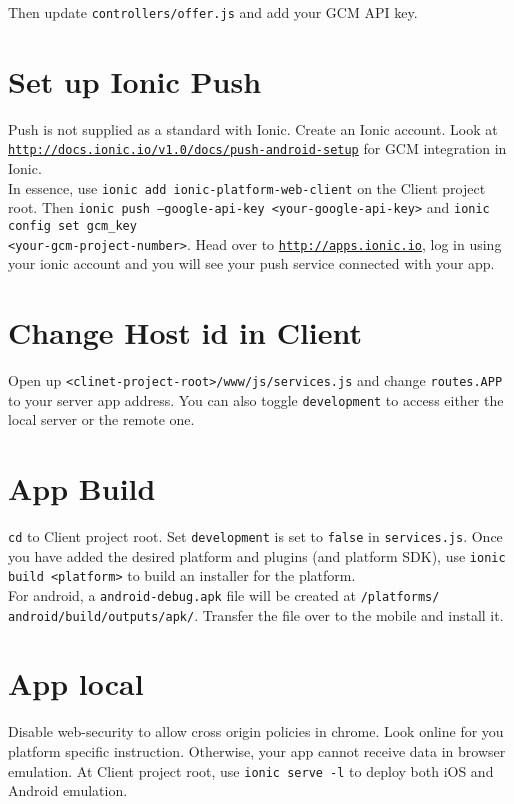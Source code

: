 Then update \texttt{controllers/offer.js} and add your GCM API key.

\section{Set up Ionic Push}

Push is not supplied as a standard with Ionic. Create an Ionic account. Look at \texttt{\hyperref[http://docs.ionic.io/v1.0/docs/push-android-setup]{http://docs.ionic.io/v1.0/docs/push-android-setup}} for GCM integration in Ionic.\\

In essence, use \texttt{ionic add ionic-platform-web-client} on the Client project root. Then \texttt{ionic push --google-api-key <your-google-api-key>} and \texttt{ionic config set gcm\_key}\\ \texttt{<your-gcm-project-number>}. Head over to \texttt{\hyperref[http://apps.ionic.io]{http://apps.ionic.io}}, log in using your ionic account and you will see your push service connected with your app.

\section{Change Host id in Client}

Open up \texttt{<clinet-project-root>/www/js/services.js} and change \texttt{routes.APP} to your server app address. You can also toggle \texttt{development} to access either the local server or the remote one.

\section{App Build}

\texttt{cd} to Client project root. Set \texttt{development} is set to \texttt{false} in \texttt{services.js}. Once you have added the desired platform and plugins (and platform SDK), use \texttt{ionic build <platform>} to build an installer for the platform.\\

For android, a \texttt{android-debug.apk} file will be created at \texttt{/platforms/\\android/build/outputs/apk/}. Transfer the file over to the mobile and install it.

\section{App local}

Disable web-security to allow cross origin policies in chrome. Look online for you platform specific instruction. Otherwise, your app cannot receive data in browser emulation. At Client project root, use \texttt{ionic serve -l} to deploy both iOS and Android emulation.